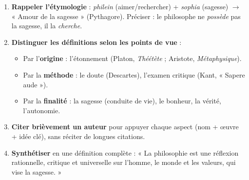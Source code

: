 \documentclass[11pt]{article}
\newcommand{\cle}[1]{{\popxbold\color{popdark}#1}}
\begin{document}
\begin{methode}
\begin{enumerate}
\item \textbf{Rappeler l'étymologie} : \emph{philein} (aimer/rechercher) + \emph{sophia} (sagesse) $\rightarrow$ « Amour de la sagesse » (Pythagore). Préciser : le philosophe ne \emph{possède} pas la sagesse, il la \emph{cherche}.
\item \textbf{Distinguer les définitions selon les points de vue} :
    \begin{itemize}
    \item Par l'\textbf{origine} : l'\cle{étonnement} (Platon, \emph{Théétète} ; Aristote, \emph{Métaphysique}).
    \item Par la \textbf{méthode} : le \cle{doute} (Descartes), l'\cle{examen critique} (Kant, « Sapere aude »).
    \item Par la \textbf{finalité} : la sagesse (conduite de vie), le bonheur, la vérité, l'autonomie.
    \end{itemize}
\item \textbf{Citer brièvement un auteur} pour appuyer chaque aspect (nom + œuvre + idée clé), sans réciter de longues citations.
\item \textbf{Synthétiser} en une définition complète : « La philosophie est une réflexion rationnelle, critique et universelle sur l'homme, le monde et les valeurs, qui vise la sagesse. »
\end{enumerate}
\end{methode}
\end{document}
